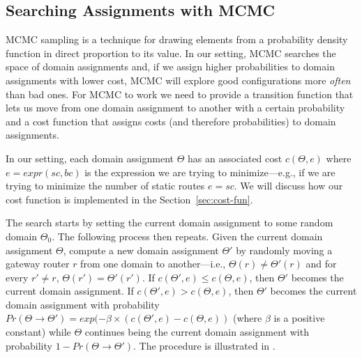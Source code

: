 \subsection{Searching Assignments with MCMC}
MCMC sampling is a technique for 
drawing elements from a
probability density function in direct proportion to its value.
In our setting, MCMC searches the space of domain assignments and,
if we assign higher probabilities to domain assignments with lower cost, MCMC will explore
good configurations more \emph{often} than bad ones.
For MCMC to work we need to provide a transition function that lets us move from one domain assignment
to another with a certain probability and a cost function that assigns costs (and therefore probabilities) to
domain assignments. 

In our setting, each domain assignment $\Theta$
has an associated cost $c(\Theta, e)$
where
$e=expr(sc, bc)$
is the expression we are trying to minimize---e.g., 
if we are trying to minimize the number of static routes $e=sc$.
We will discuss how our cost function is implemented in the Section~\ref{sec:cost-fun}.

The search starts by setting the current domain assignment 
to some random domain $\Theta_0$.
The following process then repeats.
Given the current domain
assignment $\Theta$, 
compute a new domain assignment $\Theta'$ by randomly
moving a gateway 
router $r$ from one domain to another---i.e., $\Theta(r){\neq}\Theta'(r)$ and
for every $r'{\neq} r$, $\Theta(r'){=}\Theta'(r')$.
If $c(\Theta',e)\leq c(\Theta,e)$, then $\Theta'$ becomes the current domain assignment.
If $c(\Theta',e)>c(\Theta,e)$, then $\Theta'$ becomes the current domain assignment
with probability $Pr(\Theta \rightarrow \Theta')= exp(-\beta\times(c(\Theta',e) - c(\Theta,e))$ (where $\beta$ is a positive constant) 
while 
 $\Theta$ continues being the current domain assignment with probability $1-Pr(\Theta \rightarrow \Theta')$.
\iffull
The procedure is illustrated in .
\fi

